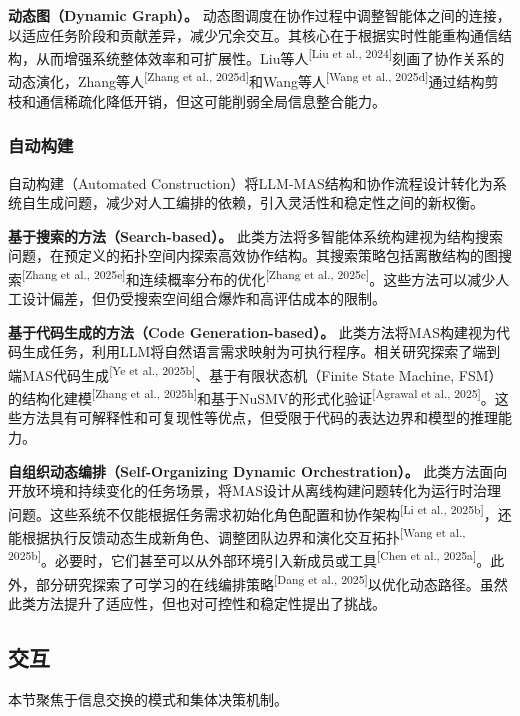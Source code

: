 \documentclass[UTF8,a4paper,12pt]{article}
\begin{document}
\textbf{动态图（Dynamic Graph）。} 动态图调度在协作过程中调整智能体之间的连接，以适应任务阶段和贡献差异，减少冗余交互。其核心在于根据实时性能重构通信结构，从而增强系统整体效率和可扩展性。Liu等人\textsuperscript{[Liu et al., 2024]}刻画了协作关系的动态演化，Zhang等人\textsuperscript{[Zhang et al., 2025d]}和Wang等人\textsuperscript{[Wang et al., 2025d]}通过结构剪枝和通信稀疏化降低开销，但这可能削弱全局信息整合能力。

\subsubsection{自动构建}

自动构建（Automated Construction）将LLM-MAS结构和协作流程设计转化为系统自生成问题，减少对人工编排的依赖，引入灵活性和稳定性之间的新权衡。

\textbf{基于搜索的方法（Search-based）。} 此类方法将多智能体系统构建视为结构搜索问题，在预定义的拓扑空间内探索高效协作结构。其搜索策略包括离散结构的图搜索\textsuperscript{[Zhang et al., 2025e]}和连续概率分布的优化\textsuperscript{[Zhang et al., 2025c]}。这些方法可以减少人工设计偏差，但仍受搜索空间组合爆炸和高评估成本的限制。

\textbf{基于代码生成的方法（Code Generation-based）。} 此类方法将MAS构建视为代码生成任务，利用LLM将自然语言需求映射为可执行程序。相关研究探索了端到端MAS代码生成\textsuperscript{[Ye et al., 2025b]}、基于有限状态机（Finite State Machine, FSM）的结构化建模\textsuperscript{[Zhang et al., 2025h]}和基于NuSMV的形式化验证\textsuperscript{[Agrawal et al., 2025]}。这些方法具有可解释性和可复现性等优点，但受限于代码的表达边界和模型的推理能力。

\textbf{自组织动态编排（Self-Organizing Dynamic Orchestration）。} 此类方法面向开放环境和持续变化的任务场景，将MAS设计从离线构建问题转化为运行时治理问题。这些系统不仅能根据任务需求初始化角色配置和协作架构\textsuperscript{[Li et al., 2025b]}，还能根据执行反馈动态生成新角色、调整团队边界和演化交互拓扑\textsuperscript{[Wang et al., 2025b]}。必要时，它们甚至可以从外部环境引入新成员或工具\textsuperscript{[Chen et al., 2025a]}。此外，部分研究探索了可学习的在线编排策略\textsuperscript{[Dang et al., 2025]}以优化动态路径。虽然此类方法提升了适应性，但也对可控性和稳定性提出了挑战。

\newpage
\subsection{交互}

本节聚焦于信息交换的模式和集体决策机制。
\end{document}
